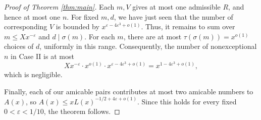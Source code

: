 \documentclass[11pt]{amsart}
\begin{document}
\begin{proof}[Proof of Theorem \ref{thm:main}]
Each $m,V$ gives at most one admissible $R$, and hence at most
one $n$. For fixed $m,d$, we have just seen that the number of corresponding $V$ is bounded by $x^{\varepsilon-4\varepsilon^3+o(1)}$.
Thus, it remains to sum over $m\le Xx^{-\varepsilon}$ and
$d\mid\sigma(m)$. For each $m$, there are at most
$\tau(\sigma(m))=x^{o(1)}$ choices of $d$, uniformly in this range.
Consequently, the number of nonexceptional $n$ in Case II is at most
\[
 Xx^{-\varepsilon}\cdot x^{o(1)}
 \cdot x^{\varepsilon-4\varepsilon^3+o(1)}
 =x^{1-4\varepsilon^3+o(1)},
\]
which is negligible.

Finally, each of our amicable pairs contributes at most two
amicable numbers to $A(x)$, so
$A(x)\le xL(x)^{-1/2+4\varepsilon+o(1)}$.
Since this holds for every fixed $0<\varepsilon<1/10$,
the theorem follows.
\end{proof}
\end{document}
